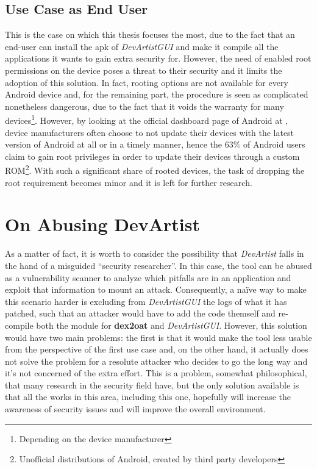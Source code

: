 \subsection{Use Case as End User}
This is the case on which this thesis focuses the most, due to the fact that an end-user can install the apk of \emph{DevArtistGUI} and make it compile all the applications it wants to gain extra security for. However, the need of enabled root permissions on the device poses a threat to their security and it limits the adoption of this solution. In fact, rooting options are not available for every Android device and, for the remaining part, the procedure is seen as complicated nonetheless dangerous, due to the fact that it voids the warranty for many devices\footnote{Depending on the device manufacturer}. However, by looking at the official dashboard page of Android at \cite{anddash}, device manufacturers often choose to not update their devices with the latest version of Android at all or in a timely manner, hence the 63\%\cite{muchroot} of Android users claim to gain root privileges in order to update their devices through a custom ROM\footnote{Unofficial distributions of Android, created by third party developers}. With such a significant share of rooted devices, the task of dropping the root requirement becomes minor and it is left for further research. 

\section{On Abusing DevArtist}
As a matter of fact, it is worth to consider the possibility that \emph{DevArtist} falls in the hand of a misguided \enquote{security researcher}. In this case, the tool can be abused as a vulnerability scanner to analyze which pitfalls are in an application and exploit that information to mount an attack. Consequently, a na\"ive way to make this scenario harder is excluding from \emph{DevArtistGUI} the logs of what it has patched, such that an attacker would have to add the code themself and re-compile both the module for \textbf{dex2oat} and \emph{DevArtistGUI}. However, this solution would have two main problems: the first is that it would make the tool less usable from the perspective of the first use case and, on the other hand, it actually does not solve the problem for a resolute attacker who decides to go the long way and it's not concerned of the extra effort. This is a problem, somewhat philosophical, that many research in the security field have, but the only solution available is that all the works in this area, including this one, hopefully will increase the awareness of security issues and will improve the overall environment.

